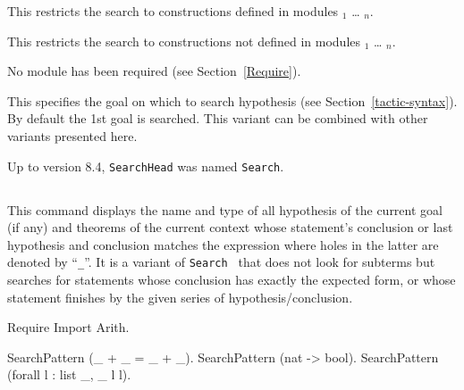 \begin{Variants}
\item
{}

This restricts the search to constructions defined in modules
{\module$_1$} \ldots{} {\module$_n$}.

\item {}

This restricts the search to constructions not defined in modules
{\module$_1$} \ldots{} {\module$_n$}.

\begin{ErrMsgs}
\item {}
No module \module{} has been required (see Section~\ref{Require}).
\end{ErrMsgs}

\item {}

  This specifies the goal on which to search hypothesis (see
  Section~\ref{tactic-syntax}). By default the 1st goal is searched.
  This variant can be combined with other variants presented here.

\end{Variants}

\Warning Up to {\Coq} version 8.4, {\tt SearchHead} was named {\tt Search}.

\subsection[\tt SearchPattern {\termpattern}.]{}

This command displays the name and type of all hypothesis of the
current goal (if any) and theorems of the current context whose statement's
conclusion or last hypothesis and conclusion matches the expression
{\term} where holes in the latter are denoted by ``{\texttt \_}''. It
is a variant of {\tt Search
  {\termpattern}} that does not look for subterms but searches for
statements whose conclusion has exactly the expected form, or whose
statement finishes by the given series of hypothesis/conclusion.

\begin{coq_example*}
Require Import Arith.
\end{coq_example*}
\begin{coq_example}
SearchPattern (_ + _ = _ + _).
SearchPattern (nat -> bool).
SearchPattern (forall l : list _, _ l l).
\end{coq_example}

